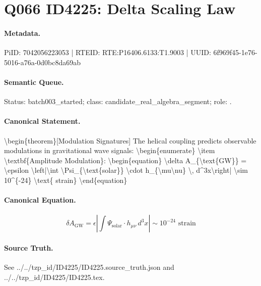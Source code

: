 \section*{Q066 ID4225: Delta Scaling Law}
\paragraph{Metadata.}
PiID: 7042056223053 | RTEID: RTE:P16406.6133:T1.9003 | UUID: 6f969f45-1e76-5016-a76a-0d0bc8da69ab

\paragraph{Semantic Queue.}
Status: batch003\_started; class: candidate\_real\_algebra\_segment; role: .

\paragraph{Canonical Statement.}
\textbackslash{}begin\{theorem\}[Modulation Signatures] The helical coupling predicts observable modulations in gravitational wave signals: \textbackslash{}begin\{enumerate\} \textbackslash{}item \textbackslash{}textbf\{Amplitude Modulation\}: \textbackslash{}begin\{equation\} \textbackslash{}delta A\_\{\textbackslash{}text\{GW\}\} = \textbackslash{}epsilon \textbackslash{}left|\textbackslash{}int \textbackslash{}Psi\_\{\textbackslash{}text\{solar\}\} \textbackslash{}cdot h\_\{\textbackslash{}mu\textbackslash{}nu\} \textbackslash{}, d\textasciicircum{}3x\textbackslash{}right| \textbackslash{}sim 10\textasciicircum{}\{-24\} \textbackslash{}text\{ strain\} \textbackslash{}end\{equation\}

\paragraph{Canonical Equation.}
\[
\begin{equation} \delta A_{\text{GW}} = \epsilon \left|\int \Psi_{\text{solar}} \cdot h_{\mu\nu} \, d^3x\right| \sim 10^{-24} \text{ strain} \end{equation}
\]

\paragraph{Source Truth.}
See ../../tzp\_id/ID4225/ID4225.source\_truth.json and ../../tzp\_id/ID4225/ID4225.tex.
